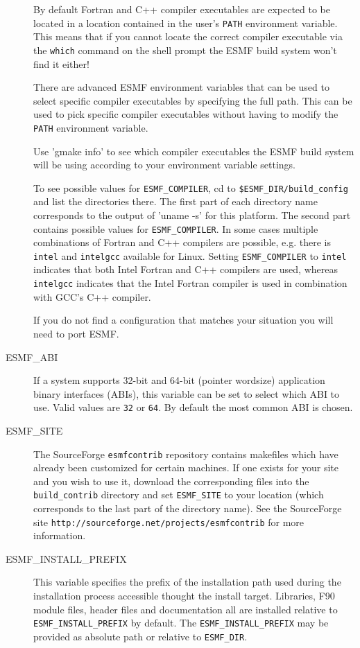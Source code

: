 \begin{description}
By default Fortran and C++ compiler executables are expected to be located in
a location contained in the user's {\tt PATH} environment variable. This means
that if you cannot locate the correct compiler executable via the {\tt which}
command on the shell prompt the ESMF build system won't find it either!

There are advanced ESMF environment variables that can be used to select 
specific compiler executables by specifying the full path. This can be used to
pick specific compiler executables without having to modify the {\tt PATH}
environment variable.

Use 'gmake info' to see which compiler executables the ESMF build system will
be using according to your environment variable settings.

To see possible values for {\tt ESMF\_COMPILER}, cd to 
{\tt \$ESMF\_DIR/build\_config} and list the directories there. The first part 
of each directory name corresponds to the output of 'uname -s' for this 
platform. The second part contains possible values for {\tt ESMF\_COMPILER}. In
some cases multiple combinations of Fortran and C++ compilers are possible, e.g.
there is {\tt intel} and {\tt intelgcc} available for Linux. Setting 
{\tt ESMF\_COMPILER} to {\tt intel} indicates that both Intel Fortran and 
C++ compilers are used, whereas {\tt intelgcc} indicates that the Intel Fortran
compiler is used in combination with GCC's C++ compiler.

If you do not find a configuration that matches your situation you will need to
port ESMF.

\item[ESMF\_ABI]
If a system supports 32-bit and 64-bit (pointer wordsize) application binary
interfaces (ABIs), this variable can be set to select which ABI to use. Valid 
values are {\tt 32} or {\tt 64}. By default the most common ABI is chosen.

\item[ESMF\_SITE]
The SourceForge {\tt esmfcontrib} repository contains makefiles which have 
already been customized for certain machines.  If one exists for your site 
and you wish to use it, download the corresponding files into the 
{\tt build\_contrib} directory and set {\tt ESMF\_SITE} to your location
(which corresponds to the last part of the directory name).  See the 
SourceForge site {\tt http://sourceforge.net/projects/esmfcontrib} for more 
information.

\item[ESMF\_INSTALL\_PREFIX]
This variable specifies the prefix of the installation path used during the
installation process accessible thought the install target. Libraries, F90
module files, header files and documentation all are installed relative to
{\tt ESMF\_INSTALL\_PREFIX} by default. The {\tt ESMF\_INSTALL\_PREFIX} may be
provided as absolute path or relative to {\tt ESMF\_DIR}.

\end{description}



